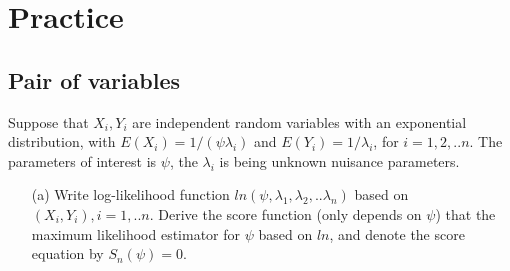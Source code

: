 \documentclass[11pt]{article} %
\begin{document}
\section{Practice}

\subsection{Pair of variables}
Suppose that $X_i, Y_i$ are independent random variables with an exponential distribution, with $E(X_i)= 1/(\psi \lambda_i)$ and $E(Y_i) = 1/\lambda_i$, for $i=1,2,..n$. The parameters of interest is $\psi$, the $\lambda_i$ is being unknown nuisance parameters.

\begin{itemize}
	\item [(a)] Write log-likelihood function $ln(\psi, \lambda_1, \lambda_2, ..\lambda_n)$ based on $(X_i, Y_i), i=1,..n$. Derive the score function (only depends on $\psi$) that the maximum likelihood estimator for $\psi$ based on $ln$, and denote the score equation by $S_n(\psi) = 0$.
	
\end{itemize}
  
\end{document}
